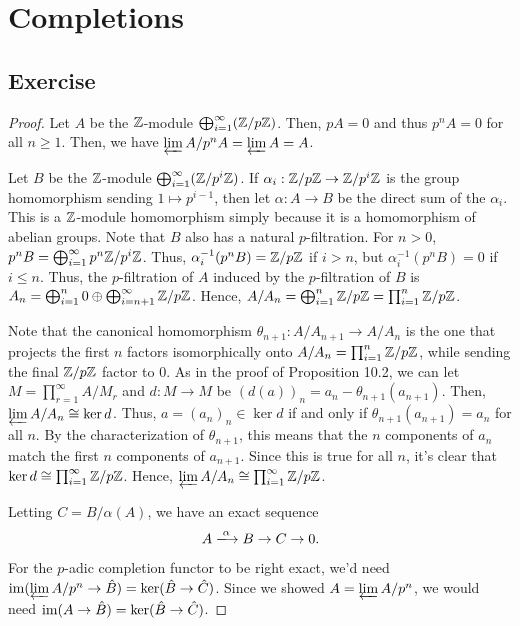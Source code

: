 \section{Completions}

\subsection{Exercise}\label{10.1}

\begin{proof}
Let $A$ be the $\mathbb{Z}$-module $\bigoplus_{i=1}^{\infty} (\mathbb{Z}/p\mathbb{Z})$. Then, $pA = 0$ and thus $p^nA = 0$ for all $n \ge 1$. Then, we have
$\varprojlim A/p^nA = \varprojlim A = A$.

Let $B$ be the $\mathbb{Z}$-module $\bigoplus_{i=1}^{\infty}(\mathbb{Z}/p^i\mathbb{Z})$. If $\alpha_i : \mathbb{Z}/p\mathbb{Z} \to \mathbb{Z}/p^i\mathbb{Z}$ is the group homomorphism sending
$1 \mapsto p^{i-1}$, then let $\alpha : A \to B$ be the direct sum of the $\alpha_i$. This is a $\mathbb{Z}$-module homomorphism simply because
it is a homomorphism of abelian groups. Note that $B$ also has a natural $p$-filtration. For $n > 0$, 
$p^n B = \bigoplus_{i=1}^{\infty} p^n \mathbb{Z} / p^i \mathbb{Z}$.
Thus, $\alpha_i^{-1}(p^n B) = \mathbb{Z}/p\mathbb{Z}$ if $i > n$, but $\alpha_i^{-1}(p^n B) = 0$ if $i \le n$. Thus, the $p$-filtration of $A$ induced by
the $p$-filtration of $B$ is $A_n = \bigoplus_{i=1}^n 0 \oplus \bigoplus_{i=n+1}^{\infty} \mathbb{Z}/p\mathbb{Z}$. Hence, 
$A/A_n = \bigoplus_{i=1}^n \mathbb{Z}/p\mathbb{Z} = \prod_{i=1}^n \mathbb{Z}/p\mathbb{Z}$.

Note that the canonical homomorphism $\theta_{n+1} : A/A_{n+1} \to A/A_n$ is the one that projects the first $n$ factors isomorphically onto
$A/A_n = \prod_{i=1}^n \mathbb{Z}/p\mathbb{Z}$, while sending the final $\mathbb{Z}/p\mathbb{Z}$ factor to $0$. As in the proof of Proposition 10.2, we can let 
$M = \prod_{r=1}^{\infty}A/M_r$ and $d : M \to M$ be $(d(a))_n = a_n - \theta_{n+1}(a_{n+1})$. Then, $\varprojlim A/A_n \cong \ker d$. Thus,
$a = (a_n)_n \in \ker d$ if and only if $\theta_{n+1}(a_{n+1}) = a_n$ for all $n$. By the characterization of $\theta_{n+1}$, this means that
the $n$ components of $a_n$ match the first $n$ components of $a_{n+1}$. Since this is true for all $n$, it's clear that 
$\ker d \cong \prod_{i=1}^{\infty}\mathbb{Z}/p\mathbb{Z}$. Hence, $\varprojlim A/A_n \cong \prod_{i=1}^{\infty}\mathbb{Z}/p\mathbb{Z}$.

Letting $C = B/\alpha(A)$, we have an exact sequence
$$A \xlongrightarrow{\alpha} B \to C \to 0.$$
For the $p$-adic completion functor to be right exact, we'd need $\operatorname{im}(\varprojlim A/p^n \to \hat B) = \ker (\hat B \to \hat C)$.
Since we showed $A = \varprojlim A/p^n$, we would need $\operatorname{im}(A \to \hat B) = \ker(\hat B \to \hat C)$.


\end{proof}
